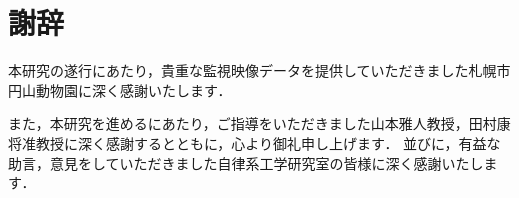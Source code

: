 \documentclass[a4paper,12pt,oneside,openany]{jsbook}
\begin{document}


\frontmatter
%

\setcounter{tocdepth}{2}
\tableofcontents
\thispagestyle{empty}

\setcounter{page}{1}

\mainmatter


\chapter*{謝辞}
本研究の遂行にあたり，貴重な監視映像データを提供していただきました札幌市円山動物園に深く感謝いたします．

また，本研究を進めるにあたり，ご指導をいただきました山本雅人教授，田村康将准教授に深く感謝するとともに，心より御礼申し上げます．
並びに，有益な助言，意見をしていただきました自律系工学研究室の皆様に深く感謝いたします．



\newpage
\end{document}
